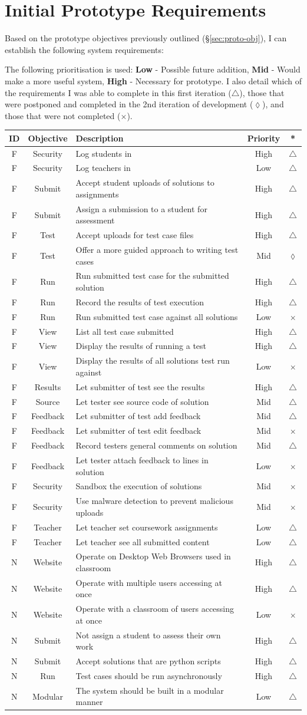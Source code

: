 \documentclass[a4paper,11pt]{report}
\newcounter{FunCount}
\newcounter{NFunCount}
\newcommand{\freq}[4]{\addtocounter{FunCount}{1}F\arabic{FunCount} \label{itm:freq\arabic{FunCount}}& #1 & #2 & #3 & #4\\}
\newcommand{\nfreq}[4]{\addtocounter{NFunCount}{1}N\arabic{NFunCount} \label{itm:nfreq\arabic{NFunCount}}& #1 & #2 & #3 & #4\\}
\begin{document}
\section{Initial Prototype Requirements}
\label{sec:req1}
Based on the  prototype objectives previously outlined (\S\ref{sec:proto-obj}), I can establish the following system requirements:\par
The following prioritisation is used: \textbf{Low} - Possible future addition, \textbf{Mid} - Would make a more useful system, \textbf{High} - Necessary for prototype. I also detail which of the requirements I was able to complete in this first iteration ($\triangle$), those that were postponed and completed in the 2nd iteration of development ($\lozenge$), and those that were not completed ($\times$).
\begin{longtable}{ccl@{}cc}
\textbf{ID} & \textbf{Objective} & \textbf{Description} & \textbf{Priority} & \textbf{*} \\\hline
\freq{Security}{Log students in}{High}{$\triangle$}
\freq{Security}{Log teachers in}{Low}{$\triangle$}
\freq{Submit}{Accept student uploads of solutions to assignments}{High}{$\triangle$}
\freq{Submit}{Assign a submission to a student for assessment}{High}{$\triangle$}
\freq{Test}{Accept uploads for test case files}{High}{$\triangle$}
\freq{Test}{Offer a more guided approach to writing test cases}{Mid}{$\lozenge$}
\freq{Run}{Run submitted test case for the submitted solution}{High}{$\triangle$}
\freq{Run}{Record the results of test execution}{High}{$\triangle$}
\freq{Run}{Run submitted test case against all solutions}{Low}{$\times$}
\freq{View}{List all test case submitted}{High}{$\triangle$}
\freq{View}{Display the results of running a test}{High}{$\triangle$}
\freq{View}{Display the results of all solutions test run against}{Low}{$\times$}
\freq{Results}{Let submitter of test see the results}{High}{$\triangle$}
\freq{Source}{Let tester see source code of solution}{Mid}{$\triangle$}
\freq{Feedback}{Let submitter of test add feedback}{Mid}{$\triangle$}
\freq{Feedback}{Let submitter of test edit feedback}{Mid}{$\times$}
\freq{Feedback}{Record testers general comments on solution}{Mid}{$\triangle$}
\freq{Feedback}{Let tester attach feedback to lines in solution}{Low}{$\times$}
\freq{Security}{Sandbox the execution of solutions}{Mid}{$\times$}
\freq{Security}{Use malware detection to prevent malicious uploads}{Mid}{$\times$}
\freq{Teacher}{Let teacher set coursework assignments}{Low}{$\triangle$}
\freq{Teacher}{Let teacher see all submitted content}{Low}{$\triangle$}
\nfreq{Website}{Operate on Desktop Web Browsers used in classroom}{High}{$\triangle$}
\nfreq{Website}{Operate with multiple users accessing at once}{High}{$\triangle$}
\nfreq{Website}{Operate with a classroom of users accessing at once}{Low}{$\times$}
\nfreq{Submit}{Not assign a student to assess their own work}{High}{$\triangle$}
\nfreq{Submit}{Accept solutions that are python scripts}{High}{$\triangle$}
\nfreq{Run}{Test cases should be run asynchronously}{High}{$\triangle$}
\nfreq{Modular}{The system should be built in a modular manner}{Low}{$\triangle$}
\end{longtable}
\end{document}

